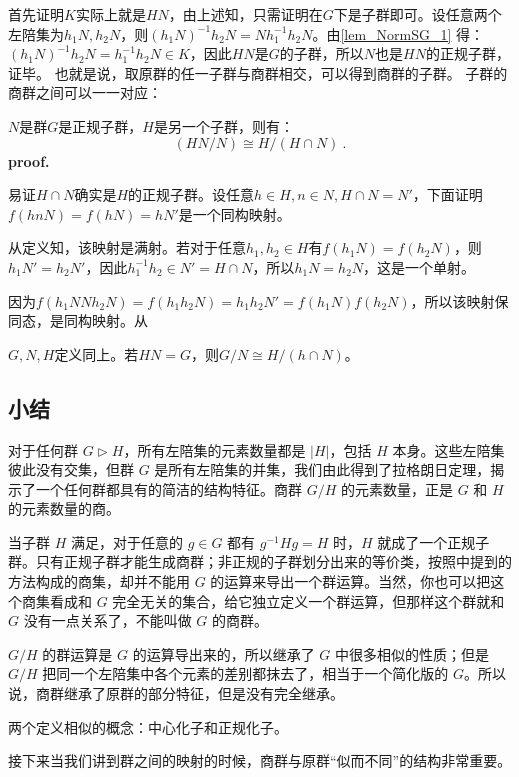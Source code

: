 首先证明$K$实际上就是$HN$，由上述知，只需证明在$G$下是子群即可。设任意两个左陪集为$h_1N,h_2N$，则$(h_1N)^{-1}h_2N=Nh_1^{-1}h_2N$。由\autoref{lem_NormSG_1} 得：$(h_1N)^{-1}h_2N=h_1^{-1}h_2N\in K$，因此$HN$是$G$的子群，所以$N$也是$HN$的正规子群，证毕。
也就是说，取原群的任一子群与商群相交，可以得到商群的子群。
子群的商群之间可以一一对应：
\begin{theorem}{}
$N$是群$G$是正规子群，$H$是另一个子群，则有：
\begin{equation}
(HN/N)\cong H/(H\cap N)~.
\end{equation}
\textbf{proof.}

易证$H\cap N$确实是$H$的正规子群。设任意$h\in H,n\in N,H\cap N=N'$，下面证明$f(hnN)=f(hN)=hN'$是一个同构映射。

从定义知，该映射是满射。若对于任意$h_1,h_2\in H$有$f(h_1N)=f(h_2N)$，则$h_1N'=h_2N'$，因此$h_1^{-1}h_2\in N'=H\cap N$，所以$h_1N=h_2N$，这是一个单射。

因为$f(h_1NNh_2N)=f(h_1h_2N)=h_1h_2N'=f(h_1N)f(h_2N)$，所以该映射保同态，是同构映射。从

\begin{corollary}{}
$G,N,H$定义同上。若$HN=G$，则$G/N\cong H/(h\cap N)$。
\end{corollary}
\end{theorem}
\subsection{小结}
对于任何群 $G\vartriangleright H$，所有左陪集的元素数量都是 $|H|$，包括 $H$ 本身。这些左陪集彼此没有交集，但群 $G$ 是所有左陪集的并集，我们由此得到了拉格朗日定理，揭示了一个任何群都具有的简洁的结构特征。商群 $G/H$ 的元素数量，正是 $G$ 和 $H$ 的元素数量的商。

当子群 $H$ 满足，对于任意的 $g\in G$ 都有 $g^{-1}Hg=H$ 时，$H$ 就成了一个正规子群。只有正规子群才能生成商群；非正规的子群划分出来的等价类，按照中提到的方法构成的商集，却并不能用 $G$ 的运算来导出一个群运算。当然，你也可以把这个商集看成和 $G$ 完全无关的集合，给它独立定义一个群运算，但那样这个群就和 $G$ 没有一点关系了，不能叫做 $G$ 的商群。

$G/H$ 的群运算是 $G$ 的运算导出来的，所以继承了 $G$ 中很多相似的性质；但是 $G/H$ 把同一个左陪集中各个元素的差别都抹去了，相当于一个简化版的 $G$。所以说，商群继承了原群的部分特征，但是没有完全继承。

两个定义相似的概念：中心化子和正规化子。

接下来当我们讲到群之间的映射的时候，商群与原群“似而不同”的结构非常重要。
